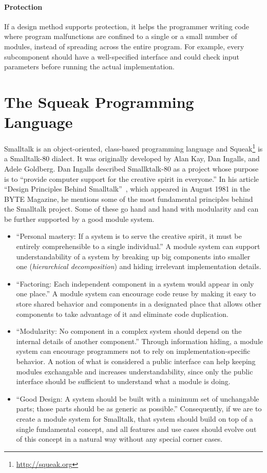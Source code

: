 \paragraph{Protection}
If a design method supports protection, it helps the programmer writing code where program malfunctions are confined to a single or a small number of modules, instead of spreading across the entire program. For example, every subcomponent should have a well-specified interface and could check input parameters before running the actual implementation.

\section{The Squeak Programming Language}
Smalltalk is an object-oriented, class-based programming language and Squeak\footnote{\url{http://squeak.org}} is a Smalltalk-80 dialect. It was originally developed by Alan Kay, Dan Ingalls, and Adele Goldberg. Dan Ingalls described Smallktalk-80 as a project whose purpose is to ``provide computer support for the creative spirit in everyone.'' In his article ``Design Principles Behind Smalltalk''~\cite{Inga81a}, which appeared in August 1981 in the BYTE Magazine, he mentions some of the most fundamental principles behind the Smalltalk project. Some of these go hand and hand with modularity and can be further supported by a good module system.

\begin{itemize}
	\item ``Personal mastery: If a system is to serve the creative spirit, it must be entirely comprehensible to a single individual.'' A module system can support understandability of a system by breaking up big components into smaller one (\emph{hierarchical decomposition}) and hiding irrelevant implementation details.
	\item ``Factoring: Each independent component in a system would appear in only one place.'' A module system can encourage code reuse by making it easy to store shared behavior and components in a designated place that allows other components to take advantage of it and eliminate code duplication.
	\item ``Modularity: No component in a complex system should depend on the internal details of another component.'' Through information hiding, a module system can encourage programmers not to rely on implementation-specific behavior. A notion of what is considered a public interface can help keeping modules exchangable and increases understandability, since only the public interface should be sufficient to understand what a module is doing.
	\item ``Good Design: A system should be built with a minimum set of unchangable parts; those parts should be as generic as possible.'' Consequently, if we are to create a module system for Smalltalk, that system should build on top of a single fundamental concept, and all features and use cases should evolve out of this concept in a natural way without any special corner cases.
\end{itemize}

